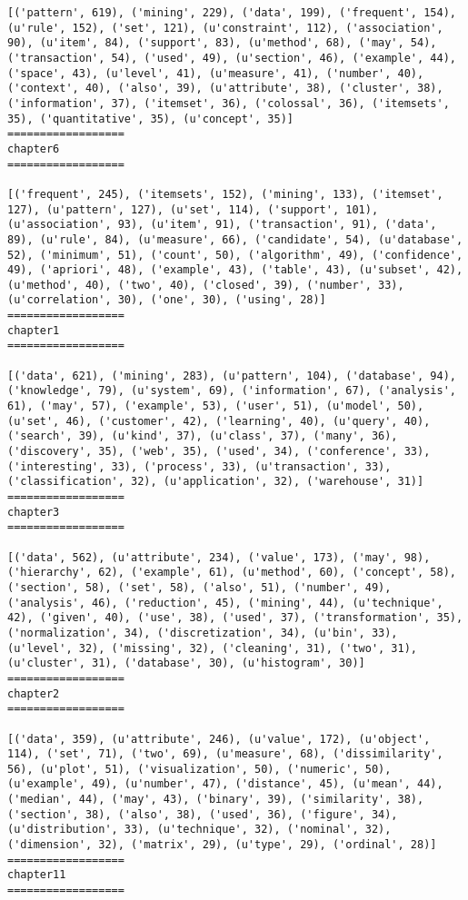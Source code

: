 \documentclass[12pt, a4paper] {article}
\begin{document}
\begin{lstlisting}[label=shell:freq_out]
[('pattern', 619), ('mining', 229), ('data', 199), ('frequent', 154), (u'rule', 152), ('set', 121), (u'constraint', 112), ('association', 90), (u'item', 84), ('support', 83), (u'method', 68), ('may', 54), ('transaction', 54), ('used', 49), (u'section', 46), ('example', 44), ('space', 43), (u'level', 41), (u'measure', 41), ('number', 40), ('context', 40), ('also', 39), (u'attribute', 38), ('cluster', 38), ('information', 37), ('itemset', 36), ('colossal', 36), ('itemsets', 35), ('quantitative', 35), (u'concept', 35)]
==================
chapter6
==================

[('frequent', 245), ('itemsets', 152), ('mining', 133), ('itemset', 127), (u'pattern', 127), (u'set', 114), ('support', 101), (u'association', 93), (u'item', 91), ('transaction', 91), ('data', 89), (u'rule', 84), (u'measure', 66), ('candidate', 54), (u'database', 52), ('minimum', 51), ('count', 50), ('algorithm', 49), ('confidence', 49), ('apriori', 48), ('example', 43), ('table', 43), (u'subset', 42), (u'method', 40), ('two', 40), ('closed', 39), ('number', 33), (u'correlation', 30), ('one', 30), ('using', 28)]
==================
chapter1
==================

[('data', 621), ('mining', 283), (u'pattern', 104), ('database', 94), ('knowledge', 79), (u'system', 69), ('information', 67), ('analysis', 61), ('may', 57), ('example', 53), ('user', 51), (u'model', 50), (u'set', 46), ('customer', 42), ('learning', 40), (u'query', 40), ('search', 39), (u'kind', 37), (u'class', 37), ('many', 36), ('discovery', 35), ('web', 35), ('used', 34), ('conference', 33), ('interesting', 33), ('process', 33), (u'transaction', 33), ('classification', 32), (u'application', 32), ('warehouse', 31)]
==================
chapter3
==================

[('data', 562), (u'attribute', 234), ('value', 173), ('may', 98), ('hierarchy', 62), ('example', 61), (u'method', 60), ('concept', 58), ('section', 58), ('set', 58), ('also', 51), ('number', 49), ('analysis', 46), ('reduction', 45), ('mining', 44), (u'technique', 42), ('given', 40), ('use', 38), ('used', 37), ('transformation', 35), ('normalization', 34), ('discretization', 34), (u'bin', 33), (u'level', 32), ('missing', 32), ('cleaning', 31), ('two', 31), (u'cluster', 31), ('database', 30), (u'histogram', 30)]
==================
chapter2
==================

[('data', 359), (u'attribute', 246), (u'value', 172), (u'object', 114), ('set', 71), ('two', 69), (u'measure', 68), ('dissimilarity', 56), (u'plot', 51), ('visualization', 50), ('numeric', 50), (u'example', 49), (u'number', 47), ('distance', 45), (u'mean', 44), ('median', 44), ('may', 43), ('binary', 39), ('similarity', 38), ('section', 38), ('also', 38), ('used', 36), ('figure', 34), (u'distribution', 33), (u'technique', 32), ('nominal', 32), ('dimension', 32), ('matrix', 29), (u'type', 29), ('ordinal', 28)]
==================
chapter11
==================


\end{lstlisting}
\end{document}
